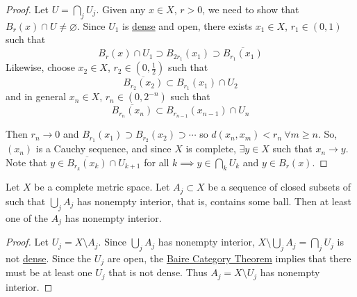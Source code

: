 \documentclass{article}
\renewcommand{\emptyset}{\varnothing}
\begin{document}
\begin{proof}
    Let $U = \bigcap_j U_j$. Given any $x \in X$, $r > 0$, we need to show that $B_r(x) \cap U \neq \emptyset$.
    Since $U_1$ is \hyperlink{def:dense}{dense} and open, there exists $x_1 \in X$, $r_1 \in (0, 1)$ such that
    \begin{equation*}
        B_r(x) \cap U_1 \supset B_{2r_1}(x_1) \supset \overline{B_{r_1}(x_1)}
    \end{equation*}
    Likewise, choose $x_2 \in X$, $r_2 \in (0, \frac{1}{2})$ such that
    \begin{equation*}
        \overline{B_{r_2}(x_2)} \subset B_{r_1}(x_1) \cap U_2
    \end{equation*}
    and in general $x_n \in X$, $r_n \in (0, 2^{-n})$ such that
    \begin{equation*}
        \overline{B_{r_n}(x_n)} \subset B_{r_{n-1}}(x_{n-1}) \cap U_n
    \end{equation*}

    Then $r_n \to 0$ and $B_{r_1}(x_1) \supset B_{r_2}(x_2) \supset \dotsb$ so $d(x_n, x_m) < r_n \ \forall m \geq n$.
    So, $(x_n)$ is a Cauchy sequence, and since $X$ is complete, $\exists y \in X$ such that $x_n \to y$.
    Note that $y \in \overline{B_{r_k}(x_k)} \cap U_{k+1}$ for all $k \implies y \in \bigcap_k U_k$ and $y \in B_r(x)$.
\end{proof}

\begin{cor}
    Let $X$ be a complete metric space.
    Let $A_j \subset X$ be a sequence of closed subsets of such that $\bigcup_j A_j$ has nonempty interior, that is, contains some ball.
    Then at least one of the $A_j$ has nonempty interior.
\end{cor}

\begin{proof}
    Let $U_j = X \setminus A_j$.
    Since $\bigcup_j A_j$ has nonempty interior, $X \setminus \bigcup_j A_j = \bigcap_j U_j$ is not \hyperlink{def:dense}{dense}.
    Since the $U_j$ are open, the \hyperlink{thm:baireCategory}{Baire Category Theorem} implies that there must be at least one $U_j$ that is not dense.
    Thus $A_j = X \setminus U_j$ has nonempty interior.
\end{proof}
\end{document}
